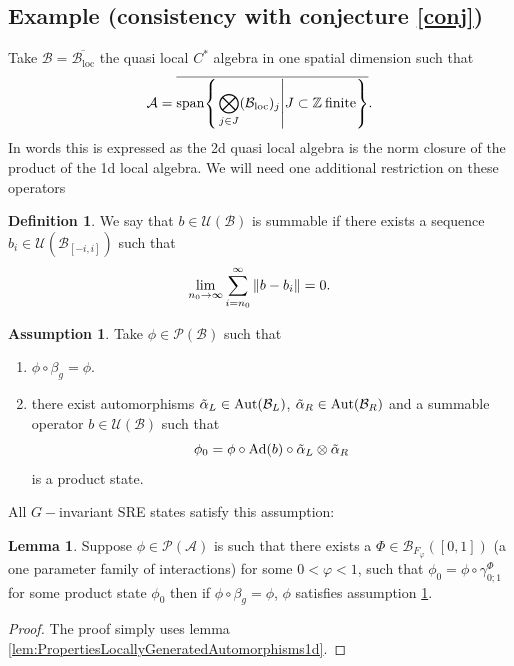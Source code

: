 \documentclass[12pt,a4paper,twoside]{article}
\let\originalleft\left
\let\originalright\right
\renewcommand{\left}{\mathopen{}\mathclose\bgroup\originalleft}
\renewcommand{\right}{\aftergroup\egroup\originalright}
\newcommand{\UU}{\mathcal U}
\newcommand{\BB}{\mathcal B}
\newcommand{\PP}{\mathcal P}
\newcommand{\ZZ}{\mathbb Z}
\renewcommand{\AA}{\mathcal A}
\newcommand{\Ad}[1]{\textrm{Ad}\left(#1\right)}
\newcommand{\Aut}[1]{\textrm{Aut}\left(#1\right)}
\theoremstyle{definition}
\newtheorem{definition}[theorem]{Definition}
\newtheorem{lemma}[theorem]{Lemma}
\newtheorem{assumption}[theorem]{Assumption}
\numberwithin{equation}{section}
\begin{document}
\subsection{Example (consistency with conjecture \ref{conj})}\label{sec:OneTranslationDirectionExample}
Take $\BB=\overline{\BB_{\text{loc}}}$ the quasi local $C^*$ algebra in one spatial dimension such that
\begin{equation}
	\AA=\overline{\textrm{span}\left\{\left.\bigotimes_{j\in J}(\BB_{\text{loc}})_j\right|J\subset \ZZ\:\text{finite}\right\}}.
\end{equation}
In words this is expressed as the 2d quasi local algebra is the norm closure of the product of the 1d local algebra. We will need one additional restriction on these operators
\begin{definition}\label{def:SummableOperator}
	We say that $b\in\UU(\BB)$ is summable if there exists a sequence $b_i\in \UU(\BB_{[-i,i]})$ such that
	\begin{equation}
		\lim_{n_0\rightarrow\infty}\sum_{i=n_0}^{\infty}\norm{b-b_i}=0.
	\end{equation}
\end{definition}
\begin{assumption}\label{assumption1d}
	Take $\phi\in\PP(\BB)$ such that
	\begin{enumerate}
		\item $\phi\circ\beta_g=\phi$.
		\item there exist automorphisms $\tilde\alpha_L\in\Aut{\BB_L}$, $\tilde\alpha_R\in\Aut{\BB_R}$ and a summable operator $b\in\UU(\BB)$ such that
		\begin{equation}
			\phi_0=\phi\circ\Ad{b}\circ\tilde\alpha_L\otimes\tilde\alpha_R
		\end{equation}
		is a product state.
	\end{enumerate}
\end{assumption}
All $G-$invariant SRE states satisfy this assumption:
\begin{lemma}\label{lem:SRE_Implies_Assumption_1d}
	Suppose $\phi\in\PP(\AA)$ is such that there exists a $\Phi\in \BB_{F_\varphi}([0,1])$ (a one parameter family of interactions) for some $0<\varphi<1$, such that $\phi_0=\phi\circ\gamma^\Phi_{0;1}$ for some product state $\phi_0$ then if $\phi\circ\beta_g=\phi$, $\phi$ satisfies assumption \ref{assumption1d}.
\end{lemma}
\begin{proof}
	The proof simply uses lemma \ref{lem:PropertiesLocallyGeneratedAutomorphisms1d}.
\end{proof}
\end{document}
